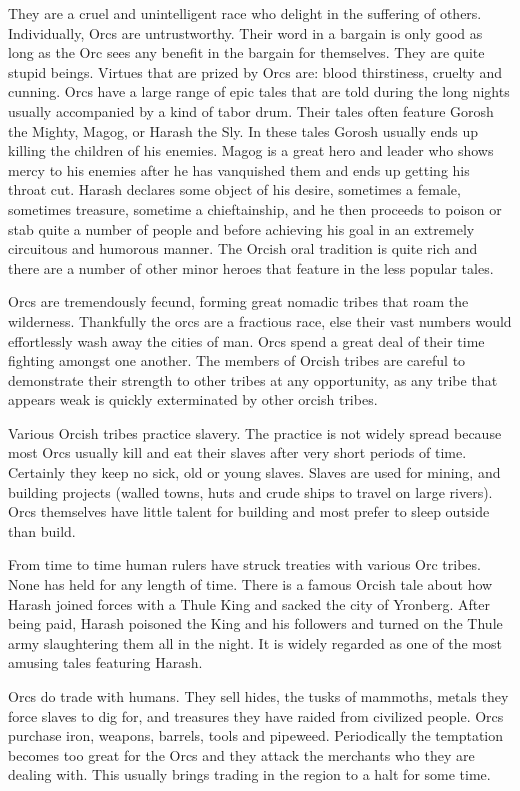 \documentclass[a4paper]{dnd5}
\begin{document}
They are a cruel and unintelligent race who delight in the suffering of 
others.  Individually, Orcs are untrustworthy.  Their word in a bargain is only good as long as the Orc sees any benefit in the bargain for themselves.  They are quite stupid beings.  Virtues that are prized by Orcs are: blood thirstiness, cruelty and cunning.  Orcs have a large range of epic tales that are told during the long nights usually accompanied by a kind of tabor drum.  Their tales often feature Gorosh the Mighty, Magog, or Harash the Sly.  In these tales Gorosh usually ends up killing the children of his enemies.  Magog is a great hero and leader who shows mercy to his enemies after he has vanquished them and ends up getting his throat cut.  Harash declares some object of his desire, sometimes a female, sometimes treasure, sometime a chieftainship, and he then proceeds to poison or stab quite a number of people and before achieving his goal in an extremely circuitous and humorous manner.  The Orcish oral tradition is quite rich and there are a number of other minor heroes that feature in the less popular tales.

Orcs are tremendously fecund, forming great nomadic tribes that roam the wilderness.  Thankfully the orcs are a fractious race, else their vast numbers would effortlessly wash away the cities of man.  Orcs spend a great deal of their time fighting amongst one another.  The members of Orcish tribes are careful to demonstrate their strength to other tribes at any opportunity, as any tribe that appears weak is quickly exterminated by other orcish tribes. 

Various Orcish tribes practice slavery.  The practice is not widely spread because most Orcs usually kill and eat their slaves after very short periods of time.  Certainly they keep no sick, old or young slaves. Slaves are used for mining, and building projects (walled towns, huts and crude ships to travel on large rivers).  Orcs themselves have little talent for building and most prefer to sleep outside than build.

From time to time human rulers have struck treaties with various Orc tribes. None has held for any length of time.  There is a famous Orcish tale about how Harash joined forces with a Thule King and sacked the city of Yronberg.  After being paid, Harash poisoned the King and his followers and turned on the Thule army slaughtering them all in the night.  It is widely regarded as one of the most amusing tales featuring Harash.

Orcs do trade with humans. They sell hides, the tusks of mammoths, metals they force slaves to dig for, and treasures they have raided from civilized people.  Orcs purchase iron, weapons, barrels, tools and pipeweed.  Periodically the temptation becomes too great for the Orcs and they attack the merchants who they are dealing with.  This usually brings trading in the region to a halt for some time.
\end{document}
